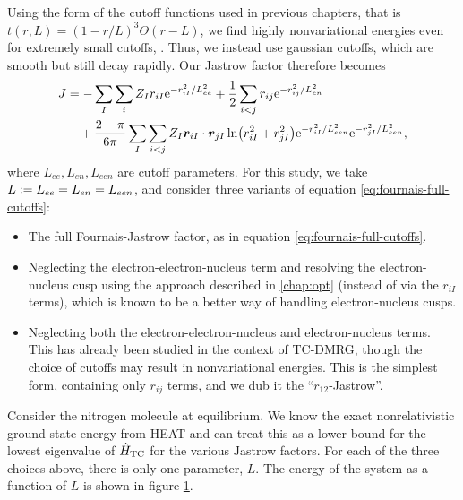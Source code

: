 Using the form of the cutoff functions used in previous chapters, that is $t(r,L) = (1-r/L)^3\Theta(r-L)$, we find highly nonvariational energies even for extremely small cutoffs, . Thus, we instead use gaussian cutoffs, which are smooth but still decay rapidly. Our Jastrow factor therefore becomes
\begin{align}
    \label{eq:fournais-full-cutoffs}
    J &= -\sum_I\sum_i Z_Ir_{iI}\mathrm{e}^{-r_{iI}^2/L_{ee}^2} + \frac 12\sum_{i<j}r_{ij}\mathrm{e}^{-r_{ij}^2/L_{en}^2} \nonumber \\
    &\quad + \frac{2-\pi}{6\pi}\sum_I\sum_{i<j}Z_I\bm r_{iI}\cdot \bm r_{jI}\ln(r_{iI}^2+r_{jI}^2)\mathrm{e}^{-r_{iI}^2/L_{een}^2}\mathrm{e}^{-r_{jI}^2/L_{een}^2},
\end{align}
where $L_{ee}, L_{en}, L_{een}$ are cutoff parameters. For this study, we take $L\mathrel{\mathop:}= L_{ee} = L_{en} = L_{een}$, and consider three variants of equation \ref{eq:fournais-full-cutoffs}:
\begin{itemize}
    \item The full Fournais-Jastrow factor, as in equation \ref{eq:fournais-full-cutoffs}.
    \item Neglecting the electron-electron-nucleus term and resolving the electron-nucleus cusp using the approach described in \autoref{chap:opt} (instead of via the $r_{iI}$ terms), which is known to be a better way of handling electron-nucleus cusps.\supercite{drummondJastrow2004,needsVariational2020}
    \item Neglecting both the electron-electron-nucleus and electron-nucleus terms. This has already been studied in the context of TC-DMRG,\supercite{szenesStriking2024} though the choice of cutoffs may result in nonvariational energies. This is the simplest form, containing only $r_{ij}$ terms, and we dub it the ``$r_{12}$-Jastrow''.
\end{itemize}

Consider the nitrogen molecule at equilibrium. We know the exact nonrelativistic ground state energy from \gls{HEAT}\supercite{fellerSurvey2008} and can treat this as a lower bound for the lowest eigenvalue of $\hat H_\mathrm{TC}$ for the various Jastrow factors. For each of the three choices above, there is only one parameter, $L$.  The energy of the system as a function of $L$ is shown in figure \ref{fig:fournais-cutoff-n2}.

\begin{figure}[htbp]
    \centering
    \caption{}
    \label{fig:fournais-cutoff-n2}
\end{figure}

